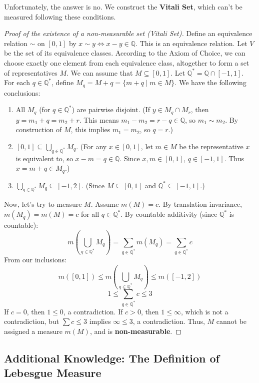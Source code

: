 \documentclass[oneside]{book}
\begin{document}
Unfortunately, the answer is no. We construct the \textbf{Vitali Set}, which can’t be measured following these conditions.

\begin{proof}[Proof of the existence of a non-measurable set (Vitali Set)]
Define an equivalence relation $\sim$ on $[0,1]$ by $x \sim y \iff x-y \in \mathbb{Q}$.
This is an equivalence relation. Let $V$ be the set of its equivalence classes.
According to the Axiom of Choice, we can choose exactly one element from each equivalence class, altogether to form a set of representatives $M$. We can assume that $M \subseteq [0,1]$.
Let $\mathbb{Q}^* = \mathbb{Q} \cap [-1, 1]$. For each $q \in \mathbb{Q}^*$, define $M_q = M+q = \{m+q \mid m \in M\}$.
We have the following conclusions:
\begin{enumerate}
    \item All $M_q$ (for $q \in \mathbb{Q}^*$) are pairwise disjoint. (If $y \in M_q \cap M_r$, then $y = m_1+q = m_2+r$. This means $m_1 - m_2 = r-q \in \mathbb{Q}$, so $m_1 \sim m_2$. By construction of $M$, this implies $m_1=m_2$, so $q=r$.)
    \item $[0,1] \subseteq \bigcup_{q \in \mathbb{Q}^*} M_q$. (For any $x \in [0,1]$, let $m \in M$ be the representative $x$ is equivalent to, so $x-m = q \in \mathbb{Q}$. Since $x,m \in [0,1]$, $q \in [-1,1]$. Thus $x = m+q \in M_q$.)
    \item $\bigcup_{q \in \mathbb{Q}^*} M_q \subseteq [-1, 2]$. (Since $M \subseteq [0,1]$ and $\mathbb{Q}^* \subseteq [-1,1]$.)
\end{enumerate}
Now, let's try to measure $M$. Assume $m(M) = c$.
By translation invariance, $m(M_q) = m(M) = c$ for all $q \in \mathbb{Q}^*$.
By countable additivity (since $\mathbb{Q}^*$ is countable):
$$ m\left(\bigcup_{q \in \mathbb{Q}^*} M_q\right) = \sum_{q \in \mathbb{Q}^*} m(M_q) = \sum_{q \in \mathbb{Q}^*} c $$
From our inclusions:
$$ m([0,1]) \le m\left(\bigcup_{q \in \mathbb{Q}^*} M_q\right) \le m([-1,2]) $$
$$ 1 \le \sum_{q \in \mathbb{Q}^*} c \le 3 $$
If $c = 0$, then $1 \le 0$, a contradiction.
If $c > 0$, then $1 \le \infty$, which is not a contradiction, but $\sum c \le 3$ implies $\infty \le 3$, a contradiction.
Thus, $M$ cannot be assigned a measure $m(M)$, and is \textbf{non-measurable}.
\end{proof}


\subsection*{Additional Knowledge: The Definition of Lebesgue Measure}
\end{document}
